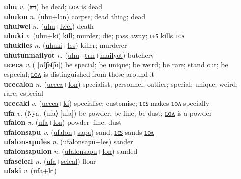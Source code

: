 \textbf{uhu} \textit{v.} (\hyperref[ici]{\sout{ici}})
be dead; \hyperref[uhulon]{ʟᴏᴧ} is dead \label{uhu} \\
\textbf{uhulon} \textit{n.} (\hyperref[uhu]{uhu}+\hyperref[lon]{lon})
corpse; dead thing; dead \label{uhulon} \\
\textbf{uhulwel} \textit{n.} (\hyperref[uhu]{uhu}+\hyperref[lwel]{lwel})
death \label{uhulwel} \\
\textbf{uhuki} \textit{v.} (\hyperref[uhu]{uhu}+\hyperref[ki]{ki})
kill; murder; die; pass away; \hyperref[uhukiles]{ʟєꜱ} kills ʟᴏᴧ \label{uhuki} \\
\textbf{uhukiles} \textit{n.} (\hyperref[uhuki]{uhuki}+\hyperref[les]{les})
killer; murderer \label{uhukiles} \\
\textbf{uhutunmailyot} \textit{n.} (\hyperref[uhu]{uhu}+\hyperref[tun]{tun}+\hyperref[mailyot]{mailyot})
butchery \label{uhutunmailyot} \\
\textbf{uceca} \textit{v.} ( [ʊt͡ʃet͡ʃɑ])
be special; be unique; be weird; be rare; stand out; be especial; \hyperref[ucecalon]{ʟᴏᴧ} is distinguished from those around it \label{uceca} \\
\textbf{ucecalon} \textit{n.} (\hyperref[uceca]{uceca}+\hyperref[lon]{lon})
specialist; personnel; outlier; special; unique; weird; rare; especial \label{ucecalon} \\
\textbf{ucecaki} \textit{v.} (\hyperref[uceca]{uceca}+\hyperref[ki]{ki})
specialise; customise; ʟєꜱ makes ʟᴏᴧ specially \label{ucecaki} \\
\textbf{ufa} \textit{v.} (Nya. ⟨ufa⟩ [ufa])
be powder; be fine; be dust; \hyperref[ufalon]{ʟᴏᴧ} is a powder \label{ufa} \\
\textbf{ufalon} \textit{n.} (\hyperref[ufa]{ufa}+\hyperref[lon]{lon})
powder; fine; dust \label{ufalon} \\
\textbf{ufalonsapu} \textit{v.} (\hyperref[ufalon]{ufalon}+\hyperref[sapu]{sapu})
sand; \hyperref[ufalonsapules]{ʟєꜱ} sands \hyperref[ufalonsapulon]{ʟᴏᴧ} \label{ufalonsapu} \\
\textbf{ufalonsapules} \textit{n.} (\hyperref[ufalonsapu]{ufalonsapu}+\hyperref[les]{les})
sander \label{ufalonsapules} \\
\textbf{ufalonsapulon} \textit{n.} (\hyperref[ufalonsapu]{ufalonsapu}+\hyperref[lon]{lon})
sanded \label{ufalonsapulon} \\
\textbf{ufaseleal} \textit{n.} (\hyperref[ufa]{ufa}+\hyperref[seleal]{seleal})
flour \label{ufaseleal} \\
\textbf{ufaki} \textit{v.} (\hyperref[ufa]{ufa}+\hyperref[ki]{ki})
